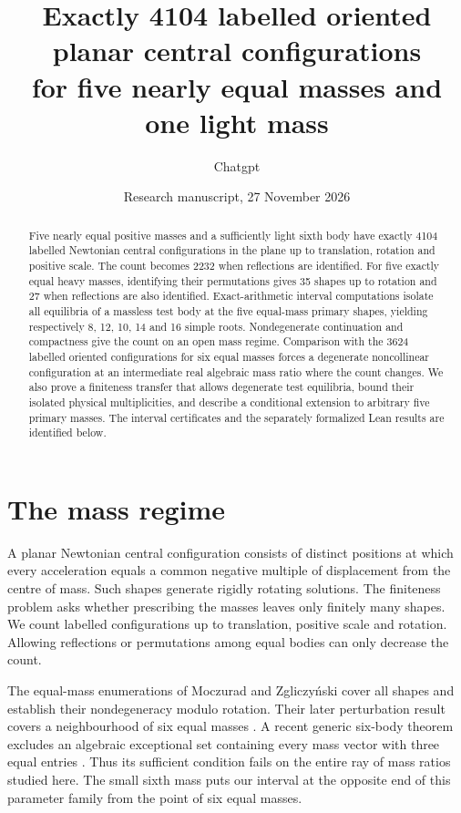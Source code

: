 \documentclass[11pt]{article}
\title{Exactly 4104 labelled oriented planar central configurations\\for five nearly equal masses and one light mass}
\author{Chatgpt}
\date{Research manuscript, 27 November 2026}
\begin{document}
\maketitle
\begin{abstract}
Five nearly equal positive masses and a sufficiently light sixth body have exactly 4104 labelled Newtonian central configurations in the plane up to translation, rotation and positive scale. The count becomes 2232 when reflections are identified. For five exactly equal heavy masses, identifying their permutations gives 35 shapes up to rotation and 27 when reflections are also identified. Exact-arithmetic interval computations isolate all equilibria of a massless test body at the five equal-mass primary shapes, yielding respectively 8, 12, 10, 14 and 16 simple roots. Nondegenerate continuation and compactness give the count on an open mass regime. Comparison with the 3624 labelled oriented configurations for six equal masses forces a degenerate noncollinear configuration at an intermediate real algebraic mass ratio where the count changes. We also prove a finiteness transfer that allows degenerate test equilibria, bound their isolated physical multiplicities, and describe a conditional extension to arbitrary five primary masses. The interval certificates and the separately formalized Lean results are identified below.
\end{abstract}

\section{The mass regime}
A planar Newtonian central configuration consists of distinct positions at which every acceleration equals a common negative multiple of displacement from the centre of mass. Such shapes generate rigidly rotating solutions. The finiteness problem asks whether prescribing the masses leaves only finitely many shapes. We count labelled configurations up to translation, positive scale and rotation. Allowing reflections or permutations among equal bodies can only decrease the count.

The equal-mass enumerations of Moczurad and Zgliczyński \cite{equal} cover all shapes and establish their nondegeneracy modulo rotation. Their later perturbation result covers a neighbourhood of six equal masses \cite{near}. A recent generic six-body theorem excludes an algebraic exceptional set containing every mass vector with three equal entries \cite{six}. Thus its sufficient condition fails on the entire ray of mass ratios studied here. The small sixth mass puts our interval at the opposite end of this parameter family from the point of six equal masses.
\end{document}
